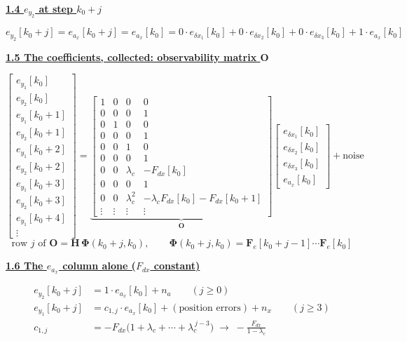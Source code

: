 \documentclass[11pt,a4paper]{ctexart}
\newcommand{\lc}{\lambda_c}
\newcommand{\hd}[1]{\par\medskip\noindent\underline{\textbf{#1}}\par\nobreak\vspace{0.2ex}}
\begin{document}
\hd{1.4 $e_{y_2}$ at step $k_0+j$}
\[
e_{y_2}[k_0+j] = e_{a_x}[k_0+j] = e_{a_x}[k_0]
= 0\cdot e_{\delta x_1}[k_0] + 0\cdot e_{\delta x_2}[k_0] + 0\cdot e_{\delta x_3}[k_0] + 1\cdot e_{a_x}[k_0]
\]

\hd{1.5 The coefficients, collected: observability matrix $\mathbf{O}$}
\[
\begin{bmatrix} e_{y_1}[k_0] \\ e_{y_2}[k_0] \\ e_{y_1}[k_0+1] \\ e_{y_2}[k_0+1] \\ e_{y_1}[k_0+2] \\ e_{y_2}[k_0+2] \\ e_{y_1}[k_0+3] \\ e_{y_2}[k_0+3] \\ e_{y_1}[k_0+4] \\ \vdots \end{bmatrix}
=
\underbrace{\begin{bmatrix}
1 & 0 & 0 & 0 \\
0 & 0 & 0 & 1 \\
0 & 1 & 0 & 0 \\
0 & 0 & 0 & 1 \\
0 & 0 & 1 & 0 \\
0 & 0 & 0 & 1 \\
0 & 0 & \lc & -F_{dx}[k_0] \\
0 & 0 & 0 & 1 \\
0 & 0 & \lc^2 & -\lc F_{dx}[k_0] - F_{dx}[k_0+1] \\
\vdots & \vdots & \vdots & \vdots
\end{bmatrix}}_{\mathbf{O}}
\begin{bmatrix} e_{\delta x_1}[k_0] \\ e_{\delta x_2}[k_0] \\ e_{\delta x_3}[k_0] \\ e_{a_x}[k_0] \end{bmatrix}
+ \text{noise}
\]
\[
\text{row } j \text{ of } \mathbf{O} = \mathbf{H}\,\bm{\Phi}(k_0+j,k_0), \qquad
\bm{\Phi}(k_0+j,k_0) = \mathbf{F}_e[k_0+j-1]\cdots\mathbf{F}_e[k_0]
\]

\hd{1.6 The $e_{a_x}$ column alone ($F_{dx}$ constant)}
\[
\begin{aligned}
e_{y_2}[k_0+j] &= 1\cdot e_{a_x}[k_0] + n_a \qquad (j \ge 0) \\
e_{y_1}[k_0+j] &= c_{1,j}\cdot e_{a_x}[k_0] + (\text{position errors}) + n_x \qquad (j \ge 3) \\
c_{1,j} &= -F_{dx}\big(1 + \lc + \cdots + \lc^{\,j-3}\big) \;\to\; -\frac{F_{dx}}{1-\lc}
\end{aligned}
\]
\end{document}

